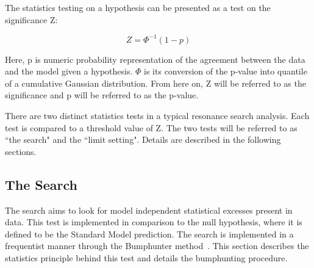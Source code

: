 The statistics testing on a hypothesis can be presented as a test on the significance Z: 

\begin{equation}
 Z= \Phi^{-1}(1-p) 
 \label{eq:significance}
\end{equation}

Here, p is numeric probability representation of the agreement between the data and the model given a hypothesis. $\Phi$ is its conversion of the p-value into quantile of a cumulative Gaussian distribution. From here on, Z will be referred to as the significance and p will be referred to as the p-value.

There are two distinct statistics tests in a typical resonance search analysis. Each test is compared to a threshold value of Z. The two tests will be referred to as ``the search" and the ``limit setting". Details are described in the following sections.





\subsection{The Search}
\label{sec:thesearch}

The search aims to look for model independent statistical excesses present in data. This test is implemented in comparison to the null hypothesis, where it is defined to be the Standard Model prediction. The search is implemented in a frequentist manner through the Bumphunter method~\cite{choudalakis2011hypothesis}. This section describes the statistics principle behind this test and details the bumphunting procedure. 



